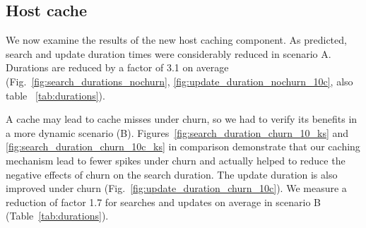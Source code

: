 \subsection{Host cache}
\label{subsec:10c}

We now examine the results of the new host caching component.
As predicted, search and update duration times were considerably reduced in scenario A.
Durations are reduced by a factor of 3.1 on average (Fig.~\ref{fig:search_durations_nochurn}, \ref{fig:update_duration_nochurn_10c}, also table ~\ref{tab:durations}).

A cache may lead to cache misses under churn, so we had to verify its benefits in a more dynamic scenario (B). 
Figures~\ref{fig:search_duration_churn_10_ks} and \ref{fig:search_duration_churn_10c_ks} in comparison demonstrate that our caching mechanism lead to fewer spikes under churn and actually helped to reduce the negative effects of churn on the search duration. 
The update duration is also improved under churn (Fig.~\ref{fig:update_duration_churn_10c}). We measure a reduction of factor 1.7 for searches and updates on average in scenario B (Table~\ref{tab:durations}).


